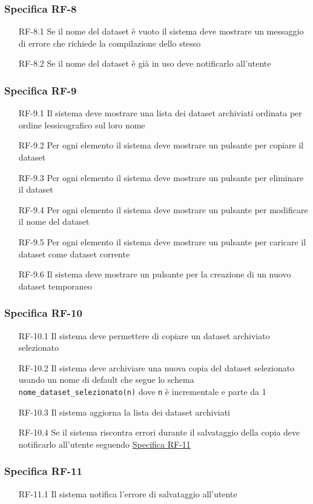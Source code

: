 \subsubsection{Specifica RF-8}
\label{subsubsec:RF-8}
\begin{enumerate}
    \item[RF-8.1] Se il nome del dataset è vuoto il sistema deve mostrare un messaggio di errore che richiede la compilazione dello stesso 
    \item[RF-8.2] Se il nome del dataset è già in uso deve notificarlo all'utente
\end{enumerate}

\subsubsection{Specifica RF-9}
\label{subsubsec:RF-9}
\begin{enumerate}
    \item[RF-9.1] Il sistema deve mostrare una lista dei dataset archiviati ordinata per ordine lessicografico sul loro nome
    \item[RF-9.2] Per ogni elemento il sistema deve mostrare un pulsante per copiare il dataset
    \item[RF-9.3] Per ogni elemento il sistema deve mostrare un pulsante per eliminare il dataset
    \item[RF-9.4] Per ogni elemento il sistema deve mostrare un pulsante per modificare il nome del dataset
    \item[RF-9.5] Per ogni elemento il sistema deve mostrare un pulsante per caricare il dataset come dataset corrente 
    \item[RF-9.6] Il sistema deve mostrare un pulsante per la creazione di un nuovo dataset temporaneo
\end{enumerate}

\subsubsection{Specifica RF-10}
\label{subsubsec:RF-10}
\begin{enumerate}
    \item[RF-10.1] Il sistema deve permettere di copiare un dataset archiviato selezionato
    \item[RF-10.2] Il sistema deve archiviare una nuova copia del dataset selezionato usando un nome di default che segue lo schema \texttt{nome\_dataset\_selezionato(n)} dove \texttt{n} è incrementale e parte da 1
    \item[RF-10.3] Il sistema aggiorna la lista dei dataset archiviati
    \item[RF-10.4] Se il sistema riscontra errori durante il salvataggio della copia deve notificarlo all'utente seguendo \hyperref[subsubsec:RF-11]{Specifica RF-11}
\end{enumerate}

\subsubsection{Specifica RF-11}
\label{subsubsec:RF-11}
\begin{enumerate}
    \item[RF-11.1] Il sistema notifica l'errore di salvataggio all'utente
\end{enumerate}


